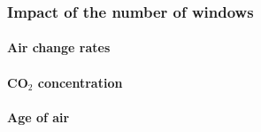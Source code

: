 
\blindtext[1]

\blindtext[1]


\cleartoleftpage

\subsubsection{Impact of the number of windows}
\enlargethispage*{4cm}

\blindtext[1]


\paragraph{Air change rates}

\blindtext[1]


\paragraph{\texorpdfstring{CO$_2$ concentration}{CO2 concentration}}

\blindtext[1]


\paragraph{Age of air}

\blindtext[1]




